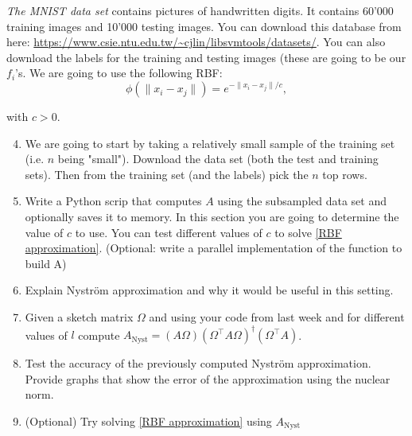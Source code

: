 \documentclass[11pt]{article}
\begin{document}
\textit{The MNIST data set} contains pictures of handwritten digits. It contains 60'000 training images and 10'000 testing images. You can download this database from here: \url{https://www.csie.ntu.edu.tw/~cjlin/libsvmtools/datasets/}. You can also download the labels for the training and testing images (these are going to be our $f_i$'s. We are going to use the following RBF: \\

\[ \phi\left( \|x_i - x_j\| \right) = e^{- \|x_i - x_j\| / c}, \]

with $c > 0$.

\begin{enumerate}
    \setcounter{enumi}{3}
    \item We are going to start by taking a relatively small sample of the training set (i.e. $n$ being "small"). Download the data set (both the test and training sets). Then from the training set (and the labels) pick the $n$ top rows.
    \item Write a Python scrip that computes $A$ using the subsampled data set and optionally saves it to memory. In this section you are going to determine the value of $c$ to use. You can test different values of $c$ to solve  \ref{RBF approximation}. (Optional: write a parallel implementation of the function to build A)
    \item Explain Nyström approximation and why it would be useful in this setting.
    \item Given a sketch matrix $\Omega$ and using your code from last week and for different values of $l$ compute $A_{\text{Nyst}} = (A\Omega)(\Omega^\top A \Omega)^{\dagger} (\Omega^\top A)$. 
    \item Test the accuracy of the previously computed Nyström approximation. Provide graphs that show the error of the approximation using the nuclear norm.
    \item (Optional) Try solving \ref{RBF approximation} using $A_{\text{Nyst}}$
\end{enumerate}



\end{document}
